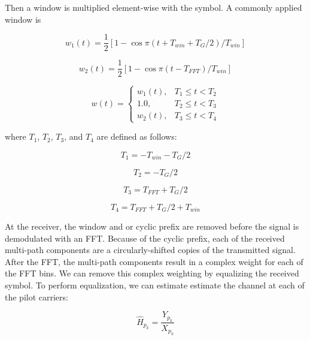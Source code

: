 \documentclass[conference]{IEEEtran}
\begin{document}
		Then a window is multiplied element-wise with the symbol. A commonly applied window is
		
		\begin{equation}
			w_1(t) = \frac{1}{2}[1 - \cos\pi(t + T_{win} + T_G/2)/T_{win}]
		\end{equation}
		
		\begin{equation}
			w_2(t) = \frac{1}{2}[1 - \cos\pi(t - T_{FFT})/T_{win}]
		\end{equation}
		
		\begin{equation}
			w(t) = \begin{cases}
				w_1(t), & T_1 \leq t < T_2 \\
				1.0, & T_2 \leq t < T_3 \\
				w_2(t), & T_3 \leq t < T_4
			\end{cases}
		\end{equation}
		
		where $T_1$, $T_2$, $T_3$, and $T_4$ are defined as follows:
		
		\begin{equation}
			T_1 = -T_{win} - T_G/2
		\end{equation}
		
		\begin{equation}
			T_2 = -T_G/2
		\end{equation}
		
		\begin{equation}
			T_3 = T_{FFT} + T_G/2
		\end{equation}
		
		\begin{equation}
			T_4 = T_{FFT} + T_G/2 + T_{win}
		\end{equation}
		
		At the receiver, the window and or cyclic prefix are removed before the signal is demodulated with an FFT. Because of the cyclic prefix, each of the received multi-path components are a circularly-shifted copies of the transmitted signal. After the FFT, the multi-path components result in a complex weight for each of the FFT bins. We can remove this complex weighting by equalizing the received symbol. To perform equalization, we can estimate estimate the channel at each of the pilot carriers:
		
		\begin{equation}
			\hat{H}_{p_k} = \frac{Y_{p_k}}{X_{p_k}}
		\end{equation}
		
\end{document}
